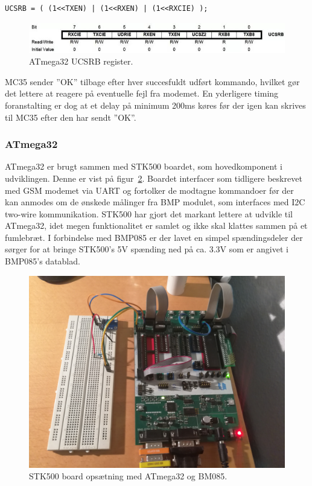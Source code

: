 \begin{lstlisting}[caption=Initiering af UCSRB.,label=code:initucsrb] 
	UCSRB = ( (1<<TXEN) | (1<<RXEN) | (1<<RXCIE) );
\end{lstlisting}

\begin{figure}[h]
	\centering
	\includegraphics[width=\linewidth]{figs/avr_register_ucsrb.jpg}
	\caption{ATmega32 UCSRB register.}
	\label{fig:regucsrb}
\end{figure}

MC35 sender ''OK'' tilbage efter hver succesfuldt udført kommando, hvilket gør det lettere at reagere på eventuelle fejl fra modemet. En yderligere timing foranstalting er dog at et delay på minimum 200ms køres
 før der igen kan skrives til MC35 efter den har sendt ''OK''. 


\subsubsection{ATmega32}
ATmega32 er brugt sammen med STK500 boardet, som hovedkomponent i udviklingen. Denne er vist på figur~\ref{fig:deviceatmege32}. 
Boardet interfacer som tidligere beskrevet med GSM modemet via UART og fortolker de modtagne kommandoer før der kan anmodes om de ønskede målinger fra BMP modulet, som interfaces med I2C two-wire kommunikation.
STK500 har gjort det markant lettere at udvikle til ATmega32, idet megen funktionalitet er samlet og ikke skal klattes sammen på et fumlebræt. I forbindelse med BMP085 er der lavet en simpel
 spændingsdeler der sørger for at bringe STK500's 5V spænding ned på ca. 3.3V som er angivet i BMP085's datablad.

\begin{figure}[h]
	\centering
	\includegraphics[width=0.7\linewidth]{figs/device_atmega32.jpg}
	\caption{STK500 board opsætning med ATmega32 og BM085.}
	\label{fig:deviceatmege32}
\end{figure}

